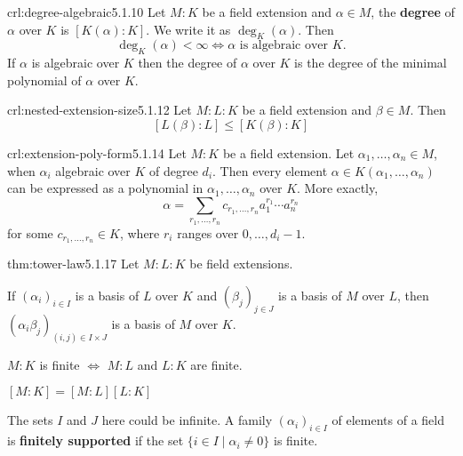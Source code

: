 \documentclass[landscape, 8pt]{extarticle}
\begin{document}
\begin{multicols}{3}

\begin{crl}{crl:degree-algebraic}{5.1.10}
    Let $M : K$ be a field extension and $\alpha\in M$, the \textbf{degree} of $\alpha$ over $K$ is $[K(\alpha) : K]$. We write it as $\deg_{K}(\alpha)$. Then
    \[\deg_{K}(\alpha) < \infty \iff \alpha \text{ is algebraic over $K$.}\]
    If $\alpha$ is algebraic over $K$ then the degree of $\alpha$ over $K$ is the degree of the minimal polynomial of $\alpha$ over $K$.
\end{crl}


\begin{crl}{crl:nested-extension-size}{5.1.12}
    Let $M : L : K$ be a field extension and $\beta \in M$. Then
    \[
        [L(\beta) : L] \le [K(\beta) : K]
    \]
\end{crl}

\begin{crl}{crl:extension-poly-form}{5.1.14}
    Let $M : K$ be a field extension. Let $\alpha_{1},\dots, \alpha_{n}\in M$, when $\alpha_{i}$ algebraic over $K$ of degree $d_{i}$. Then every element $\alpha\in K(\alpha_{1},\dots,\alpha_{n})$ can be expressed as a polynomial in $\alpha_{1},\dots,\alpha_{n}$ over $K$. More exactly,
    \[\alpha = \sum_{r_{1},\dots,r_{n}} c_{r_{1},\dots,r_{n}}a^{r_{1}}_{1} \cdots a^{r_{n}}_{n}\]
    for some $c_{r_{1},\dots,r_{n}}\in K$, where $r_{i}$ ranges over $0,\dots,d_{i}-1$.
\end{crl}

\newpage
\begin{thm}{thm:tower-law}{5.1.17}
    Let $M : L : K$ be field extensions.
    \begin{enumerate-tight}
        \item If $(\alpha_{i})_{i\in I}$ is a basis of $L$ over $K$ and $(\beta_{j})_{j\in J}$ is a basis of $M$ over $L$, then $(\alpha_{i}\beta_{j})_{(i,j)\in I \times J}$ is a basis of $M$ over $K$.
        \item $M : K$ is finite $\iff$ $M : L$ and $L : K$ are finite.
        \item $[M : K] = [M : L][L : K]$
    \end{enumerate-tight}
    The sets $I$ and $J$ here could be infinite. A family $(\alpha_{i})_{i\in I}$ of elements of a field is \textbf{finitely supported} if the set $\{i\in I \mid \alpha_{i} \ne 0\}$ is finite.
\end{thm}


\end{multicols}
\end{document}
